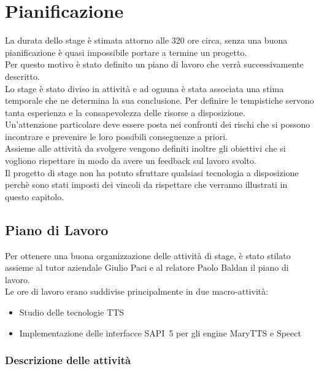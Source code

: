 \chapter{Pianificazione} %
La durata dello stage è stimata attorno alle 320 ore circa, senza una buona pianificazione è quasi impossibile portare a termine un progetto.\\
Per questo motivo è stato definito un piano di lavoro che verrà successivamente descritto.\\
Lo stage è stato diviso in attività e ad ognuna è stata associata una stima temporale che ne determina la sua conclusione. Per definire le tempistiche servono tanta esperienza e la consapevolezza delle risorse a disposizione.\\
Un'attenzione particolare deve essere posta nei confronti dei rischi che si possono incontrare e prevenire le loro possibili conseguenze a priori.\\
Assieme alle attività da svolgere vengono definiti inoltre gli obiettivi che si vogliono rispettare in modo da avere un feedback sul lavoro svolto.\\
Il progetto di stage non ha potuto sfruttare qualsiasi tecnologia a disposizione perchè sono stati imposti dei vincoli da rispettare che verranno illustrati in questo capitolo. 

\thispagestyle{empty}

\newpage
\section{Piano di Lavoro}
Per ottenere una buona organizzazione delle attività di stage, è stato stilato assieme al tutor aziendale Giulio Paci e al relatore Paolo Baldan il piano di lavoro.\\
Le ore di lavoro erano suddivise principalmente in due macro-attività:
\begin{itemize}
	\item Studio delle tecnologie TTS
	\item Implementazione delle interfacce SAPI~5 per gli engine MaryTTS e Speect
\end{itemize}

\subsection{Descrizione delle attività}

